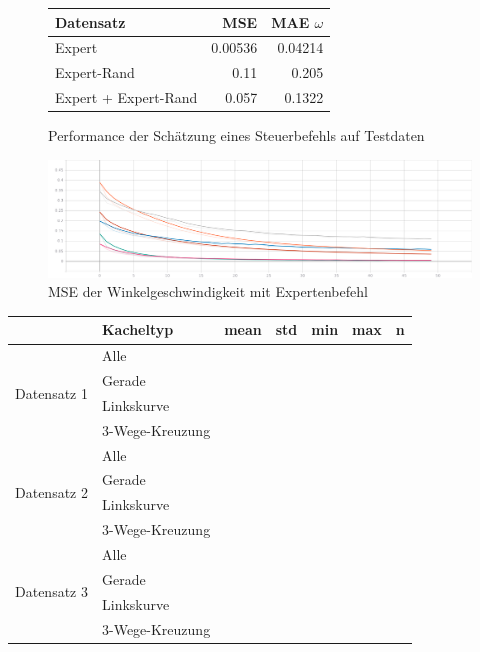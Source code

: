 \begin{figure}[H]
	\centering
	\begin{tabular}[t]{|l|r|r|}
		\hline
		Datensatz & MSE & MAE $\omega$ \\
		\hline
		Expert & 0.00536 & 0.04214 \\
		\hline
		Expert-Rand & 0.11 & 0.205 \\
		\hline
		Expert + Expert-Rand & 0.057 & 0.1322 \\
		\hline
	\end{tabular}
	\caption{Performance der Schätzung eines Steuerbefehls auf Testdaten}
	\label{expert-performance}
\end{figure}

\begin{figure}[H]
	\centering
	\includegraphics[width=\linewidth]{kapitel5/images/expert/Loss-expert.png}
	\caption{MSE der Winkelgeschwindigkeit mit Expertenbefehl}
	\label{expert-mse-omega}
\end{figure}


\begin{tabular}[t]{|c|l|l|l|l|l|l|}
	\hline
	 & \textbf{Kacheltyp} & \textbf{mean} & \textbf{std} & \textbf{min} & \textbf{max} & \textbf{n} \\
	\hline
	\multirow{4}{*}{Datensatz 1} 
	& Alle & & & & & \\
	\cline{2-7}
	& Gerade & & & & & \\
	\cline{2-7}
	& Linkskurve & & & & & \\
	\cline{2-7}
	& 3-Wege-Kreuzung & & & & & \\
	\hline
	\multirow{4}{*}{Datensatz 2} 
	& Alle & & & & & \\
	\cline{2-7}
	& Gerade & & & & & \\
	\cline{2-7}
	& Linkskurve & & & & & \\
	\cline{2-7}
	& 3-Wege-Kreuzung & & & & & \\
	\hline
	\multirow{4}{*}{Datensatz 3} 
	& Alle & & & & & \\
	\cline{2-7}
	& Gerade & & & & & \\
	\cline{2-7}
	& Linkskurve & & & & & \\
	\cline{2-7}
	& 3-Wege-Kreuzung & & & & & \\
	\hline
\end{tabular}
